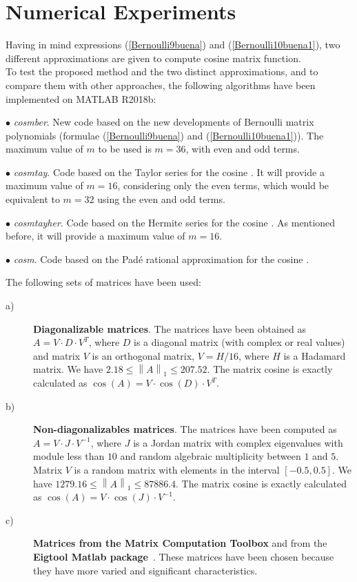 \section{Numerical Experiments}\label{section3}
Having in mind expressions (\ref{Bernoulli9buena}) and (\ref{Bernoulli10buena1}), two different approximations are given to compute cosine matrix function.\\
To test the proposed method and the two distinct approximations, and to compare them with other approaches, the following algorithms have been implemented on MATLAB R2018b:

\begin{description}
\item $\bullet$  \emph{cosmber}. New code based on the new developments of Bernoulli matrix polynomials (formulae (\ref{Bernoulli9buena}) and (\ref{Bernoulli10buena1})). The maximum value of $m$ to be used is $m=36$, with even and odd terms.
\item $\bullet$  \emph{cosmtay}. Code based on the Taylor series for the cosine \cite{sastre2017two}. It will provide a maximum value of $m=16$, considering only the even terms, which would be equivalent to $m=32$ using the even and odd terms.
\item $\bullet$   \emph{cosmtayher}. Code based on the Hermite series for the cosine \cite{defez2019efficient}. As mentioned before, it will provide a maximum value of $m=16$.
\item $\bullet$   \emph{cosm}. Code based on the Pad\'e rational approximation for the cosine \cite{AlHR15}.
\end{description}

The following sets of matrices have been used:

\begin{description}
\item[a)] \textbf{Diagonalizable matrices}. The matrices have been obtained as $A=V \cdot D \cdot V^{T}$,
where $D$ is a diagonal matrix (with complex or real values) and matrix $V$ is an orthogonal matrix, $V=H/16$, where $H$ is a Hadamard matrix.
We have $2.18 \leq \left\|A \right\|_1 \leq 207.52$. The matrix cosine is exactly calculated as $\cos{(A)}=V \cdot \cos{(D)} \cdot V^{T}$.

\item[b)] \textbf{Non-diagonalizables matrices}. The matrices have been computed as $A=V \cdot J \cdot V^{-1}$, where
$J$ is a Jordan matrix with complex eigenvalues with module less than $10$ and random algebraic multiplicity between $1$ and $5$. Matrix $V$ is a random
matrix with elements in the interval $[-0.5,0.5]$. We have $1279.16 \leq \left\|A \right\|_1 \leq 87886.4$. The matrix cosine
is exactly calculated as $\cos{(A)}=V \cdot \cos{(J)} \cdot V^{-1}$.

\item[c)] \textbf{Matrices from the Matrix Computation Toolbox} \cite{higham1995test} and from the  \textbf{Eigtool Matlab package}~\cite{wright2009eigtool}. These matrices have been chosen because they have more varied and significant characteristics.
\end{description}

